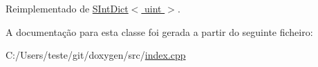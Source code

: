 Reimplementado de \hyperlink{class_s_int_dict_aade9045d8c0047e0427d8c6a9c048985}{S\-Int\-Dict$<$ uint $>$}.



A documentação para esta classe foi gerada a partir do seguinte ficheiro\-:\begin{DoxyCompactItemize}
\item 
C\-:/\-Users/teste/git/doxygen/src/\hyperlink{index_8cpp}{index.\-cpp}\end{DoxyCompactItemize}
